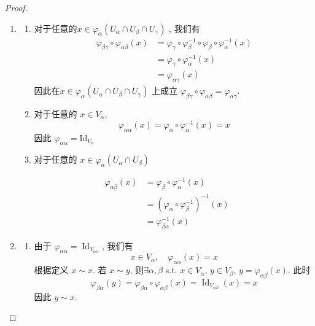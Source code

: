 \documentclass[../main.tex]{subfiles}
\begin{document}
\begin{proof}
 \begin{enumerate}
    \item \begin{enumerate}
        \item 对于任意的\( x\in  \varphi _{\alpha }\left( U_{\alpha }\cap U_{\beta }\cap U_{ \gamma } \right)   \) , 我们有 \[
        \begin{aligned}
         \varphi _{\beta  \gamma }\circ  \varphi _{\alpha \beta }\left( x \right) &=   \varphi _{ \gamma }\circ  \varphi _{\beta }^{-1} \circ  \varphi _{\beta }\circ  \varphi _{\alpha }^{-1}  \left( x \right)\\ 
          &=  \varphi _{ \gamma }\circ  \varphi _{\alpha }^{-1} \left( x \right)\\ 
           &=   \varphi _{\alpha  \gamma }\left( x \right)   
        \end{aligned}
        \]因此在\( x\in  \varphi _{\alpha }\left( U_{\alpha }\cap U_{\beta }\cap U_{ \gamma } \right)   \) 上成立 \(   \varphi _{\beta  \gamma }\circ  \varphi _{\alpha \beta }=  \varphi _{\alpha  \gamma }  \).
        \item 对于任意的 \(  x \in V_{\alpha }  \), \[
         \varphi _{\alpha \alpha }\left( x \right) =  \varphi _{\alpha }\circ  \varphi _{\alpha }^{-1} \left( x \right) = x
        \]    因此 \(   \varphi _{\alpha  \alpha }= \mathrm{Id}_{V_{\alpha }}  \) 
        \item 对于任意的 \( x\in  \varphi _{\alpha }\left( U_{\alpha }\cap U_{\beta }\right)   \) 
    \end{enumerate}
    \[
    \begin{aligned}
     \varphi _{\alpha \beta }\left( x \right)&=  \varphi _{\beta }\circ  \varphi _{\alpha }^{-1} \left( x \right)\\ 
      &= \left(  \varphi  _{\alpha }\circ  \varphi _{\beta }^{-1}  \right)^{-1} \left( x \right)\\ 
       &=       \varphi _{\beta  \alpha }^{-1} \left( x \right) 
    \end{aligned}
    \]
    \item \begin{enumerate}
        \item 由于 \(   \varphi _{ \alpha  \alpha }= \operatorname{Id}_{V_{\alpha  \alpha }}  \), 我们有  \[
        x\in V_{\alpha },\quad  \varphi _{\alpha  \alpha }\left( x \right) = x
        \]根据定义 \(  x\sim x  \).
        若 \(  x\sim y  \), 则\(  \exists \alpha ,\beta   \) s.t. \(  x\in V_{\alpha }  \), \(  y \in V_{\beta }  \), \(  y=  \varphi _{\alpha \beta }\left( x \right)   \). 此时 \[
         \varphi _{\beta \alpha }\left( y \right)=  \varphi _{\beta \alpha }\circ \varphi _{\alpha \beta }\left( x \right)= \operatorname{Id}_{V_{\alpha \beta }}\left( x \right)= x   
        \]      因此 \(  y \sim x  \).
        

\end{enumerate}
\end{enumerate}
\end{proof}
\end{document}
